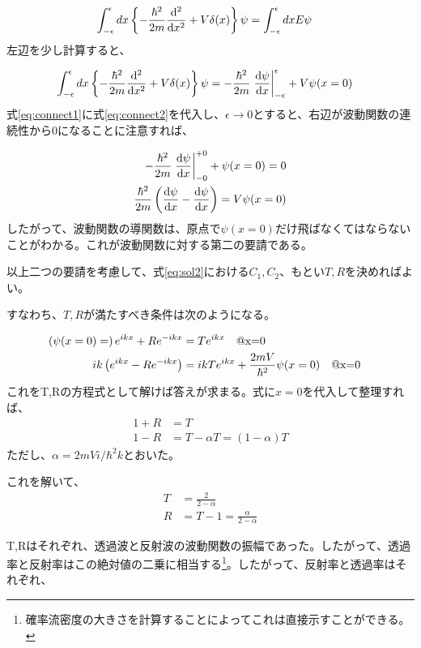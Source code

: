 \documentclass[uplatex,dvipdfmx]{jsarticle}
\begin{document}
\begin{align}
    \int_{-\epsilon}^{\epsilon}dx \left\{-\frac{\hbar^2}{2m} \dv[2]{}{x} + V\delta(x) \right\}\psi &= \int_{-\epsilon}^{\epsilon} dx E\psi \label{eq:connect1}
\end{align}
左辺を少し計算すると、

\begin{align}
    \int_{-\epsilon}^{\epsilon} dx \left\{-\frac{\hbar^2}{2m} \dv[2]{}{x} + V\delta(x) \right\}\psi &= 
        -\frac{\hbar^2}{2m} \eval{\dv{\psi}{x}}_{-\epsilon}^{\epsilon} + V\psi(x=0) \label{eq:connect2}
\end{align}
式\ref{eq:connect1}に式\ref{eq:connect2}を代入し、$\epsilon \rightarrow 0$とすると、右辺が波動関数の連続性から0になることに注意すれば、

\begin{align}
    -\frac{\hbar^2}{2m} \eval{\dv{\psi}{x}}_{-0}^{+0} + \psi(x=0) = 0 \\
    \frac{\hbar^2}{2m} \left(\dv{\psi}{x} (x=+0)-\dv{\psi}{x} (x=-0)\right) = V\psi(x=0)
\end{align}
したがって、波動関数の導関数は、原点で$\psi(x=0)$だけ飛ばなくてはならないことがわかる。これが波動関数に対する第二の要請である。


以上二つの要請を考慮して、式\ref{eq:sol2}における$C_1,C_2$、もとい$T,R$を決めればよい。

すなわち、$T,R$が満たすべき条件は次のようになる。

\begin{align}
    \left(\psi(x=0) =\right) e^{ikx} + R e^{-ikx} &= T e^{ikx} \qq{@x=0} \\
    ik\left(e^{ikx} - R e^{-ikx} \right) &= ikT e^{ikx}+\frac{2mV}{\hbar^2}\psi(x=0) \qq{@x=0}
\end{align}
これをT,Rの方程式として解けば答えが求まる。式に$x=0$を代入して整理すれば、
\begin{align}
    1 + R &= T \\
    1 - R &= T - \alpha T = (1-\alpha)T   
\end{align}
ただし、$\alpha = 2mVi/\hbar^2k$とおいた。

これを解いて、
\begin{align}
    T &= \frac{2}{2-\alpha} \\
    R &= T-1 = \frac{\alpha}{2-\alpha}
\end{align}

T,Rはそれぞれ、透過波と反射波の波動関数の振幅であった。したがって、透過率と反射率はこの絶対値の二乗に相当する\footnote{確率流密度の大きさを計算することによってこれは直接示すことができる。}。したがって、反射率と透過率はそれぞれ、
\end{document}

